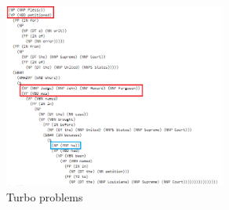 \documentclass{article}
\begin{document}
\begin{figure}[H]
    \centering
\includegraphics[width=0.65\textwidth]{Example5.png}
    \caption{Turbo problems}
\end{figure}
\end{document}

